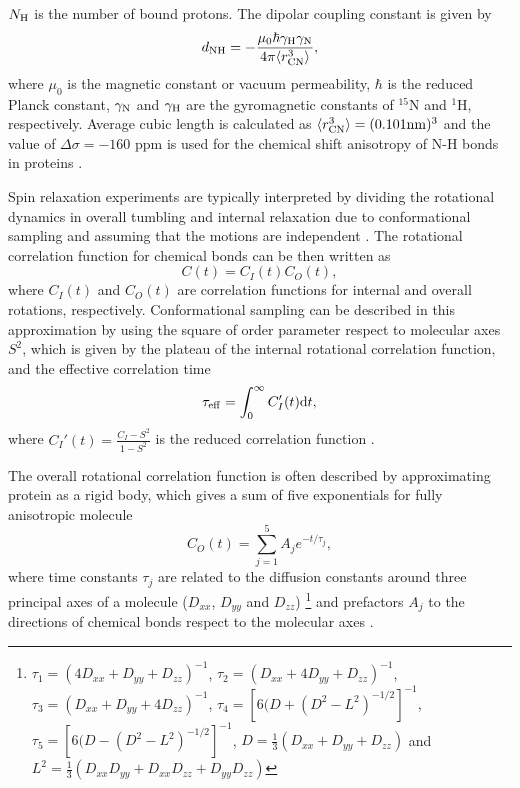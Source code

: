 \documentclass[pre,aps,floatfix,authordate1-4,twocolumn]{revtex4-1}
\begin{document}
$N_{\rm{H}}$ is the number of bound protons.
The dipolar coupling constant is given by
\begin{equation}
d_{\rm{NH}}=-\frac{\mu_0\hbar\gamma_{\rm{H}}\gamma_{\rm{N}}}{4\pi\langle r_{\rm{CN}}^3\rangle},\nonumber
\end{equation}
where $\mu_0$ is the magnetic constant or vacuum permeability, $\hbar$ is the reduced Planck constant,
$\gamma_{\rm{N}}$ and $\gamma_{\rm{H}}$ are the gyromagnetic constants of $^{15}$N and $^1$H, respectively.
Average cubic length is calculated as $\langle r_{\rm{CN}}^3\rangle = (0.101{\rm nm})^3$ and the 
value of $\Delta \sigma = -160$ ppm is used for the chemical shift anisotropy of N-H bonds in 
proteins \cite{kay89,hiyama88}.

Spin relaxation experiments are typically interpreted by
dividing the rotational dynamics in overall tumbling 
and internal relaxation due to conformational sampling 
and assuming that the motions are 
independent \cite{wennerstrom79,Lipari82,jarymowycz06,korzhnev01}.
The rotational correlation function for chemical bonds can be then written as
\begin{equation}\label{CORRFsep}
  C(t)=C_I(t)C_O(t),
\end{equation}
where $C_I(t)$ and $C_O(t)$ are correlation functions for internal and overall
rotations, respectively. Conformational sampling can be described
in this approximation by using the square of order parameter respect to 
molecular axes $S^2$, which is given by the plateau of the internal rotational 
correlation function, and the effective correlation time 
\begin{equation}\label{effCT}
  \tau_{\rm eff}=\int_0^\infty C_I'(t) \mathrm{d}t,
\end{equation}
where $C_I'(t)=\frac{C_I-S^2}{1-S^2}$ is the reduced correlation function \cite{Lipari82}.

The overall rotational correlation function is often described
by approximating protein as a rigid body, which gives 
a sum of five exponentials for fully anisotropic molecule \cite{woessner62,korzhnev01}
\begin{equation}\label{CORRFanisot}
  C_O(t)=\sum_{j=1}^5 A_j e^{-t/\tau_j},
\end{equation}
where time constants $\tau_j$ are related 
to the diffusion constants around
three principal axes of a molecule
($D_{xx}$, $D_{yy}$ and $D_{zz}$)  
\footnote{
$\tau_1=(4D_{xx}+D_{yy}+D_{zz})^{-1}$,
$\tau_2=(D_{xx}+4D_{yy}+D_{zz})^{-1}$,
$\tau_3=(D_{xx}+D_{yy}+4D_{zz})^{-1}$,
$\tau_4=[6(D+(D^2-L^2)^{-1/2}]^{-1}$,
$\tau_5=[6(D-(D^2-L^2)^{-1/2}]^{-1}$,
$D=\frac{1}{3}(D_{xx}+D_{yy}+D_{zz})$ and 
$L^2=\frac{1}{3}(D_{xx}D_{yy}+D_{xx}D_{zz}+D_{yy}D_{zz})$}
and prefactors $A_j$ to the directions of chemical bonds 
respect to the molecular axes \cite{woessner62,luginbuhl97}.
\end{document}
